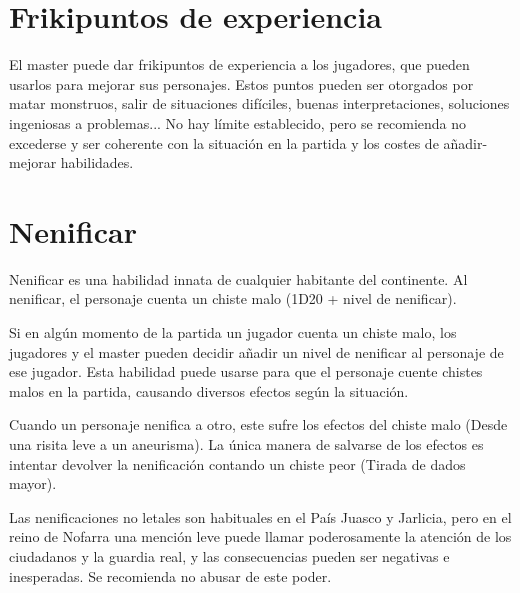 \section{Frikipuntos de experiencia}

El master puede dar frikipuntos de experiencia a los jugadores, que pueden usarlos para mejorar sus personajes. Estos puntos pueden ser otorgados por matar monstruos, salir de situaciones difíciles, buenas interpretaciones, soluciones ingeniosas a problemas... No hay límite establecido, pero se recomienda no excederse y ser coherente con la situación en la partida y los costes de añadir-mejorar habilidades.

\section{Nenificar}

Nenificar es una habilidad innata de cualquier habitante del continente. Al nenificar, el personaje cuenta un chiste malo (1D20 + nivel de nenificar). 
\par 
Si en algún momento de la partida un jugador cuenta un chiste malo, los jugadores y el master pueden decidir añadir un nivel de nenificar al personaje de ese jugador. Esta habilidad puede usarse para que el personaje cuente chistes malos en la partida, causando diversos efectos según la situación.
\par 
Cuando un personaje nenifica a otro, este sufre los efectos del chiste malo (Desde una risita leve a un aneurisma). La única manera de salvarse de los efectos es intentar devolver la nenificación contando un chiste peor (Tirada de dados mayor).
\par 
Las nenificaciones no letales son habituales en el País Juasco y Jarlicia, pero en el reino de Nofarra una mención leve puede llamar poderosamente la atención de los ciudadanos y la guardia real, y las consecuencias pueden ser negativas e inesperadas. Se recomienda no abusar de este poder.